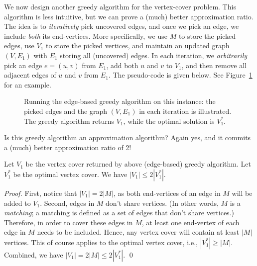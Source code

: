 We now design another greedy algorithm for the vertex-cover problem.
This algorithm is less intuitive, but we can prove a (much) better approximation ratio.
The idea is to \emph{iteratively} pick uncovered edges, and once we pick an edge,
we include \emph{both} its end-vertices.
More specifically, we use $M$ to store the picked edges, use $V_1$ to store the picked vertices,
and maintain an updated graph $(V, E_1)$ with $E_1$ storing all (uncovered) edges. In each iteration,
we \emph{arbitrarily} pick an edge $e=(u,v)$ from $E_1$, add both $u$ and $v$ to $V_1$, 
and then remove all adjacent edges of $u$ and $v$ from $E_1$.
The pseudo-code is given below. See Figure~\ref{fig:greedy2} for an example.

\begin{minipage}{0.8\textwidth}
	\xxx
	\xxx
	\xxx
	\xxx
	\xxx
	\xxx
	\xxx
	\xxx
	\xxx
	\xxx
\end{minipage}


\begin{figure}[h]
\centering{}
\caption{Running the edge-based greedy algorithm on this instance:
the picked edges and the graph $(V, E_1)$ in each iteration is illustrated. 
The greedy algorithm returns $V_1$, while the optimal solution is $V_1^*$.}
\label{fig:greedy2}
\end{figure}

Is this greedy algorithm an approximation algorithm? Again yes, and it commits
a (much) better approximation ratio of 2!
\begin{fact}
Let $V_1$ be the vertex cover returned by above (edge-based) greedy algorithm.
Let $V_1^*$ be the optimal vertex cover.
We have $|V_1| \le 2 |V_1^*|$.
\end{fact}
\emph{Proof.} First, notice that $|V_1| = 2|M|$, as both end-vertices
of an edge in $M$ will be added to $V_1$. Second, edges in $M$ don't
share vertices. (In other words, $M$ is a \emph{matching}; a matching
is defined as a set of edges that don't share vertices.)
Therefore, in order to cover these edges in $M$, at least
one end-vertex of each edge in $M$ needs to be included.
Hence, any vertex cover will contain at least $|M|$ vertices.
This of course applies to the optimal vertex cover, i.e., $|V_1^*| \ge |M|$.
Combined, we have $|V_1| = 2|M| \le 2|V_1^*|$.  \qed

